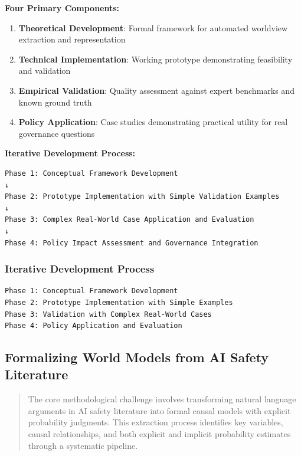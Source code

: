 \documentclass[
  11pt,
  letterpaper,
]{book}
\providecommand{\tightlist}{%
  \setlength{\itemsep}{0pt}\setlength{\parskip}{0pt}}
\begin{document}
\textbf{Four Primary Components:}

\begin{enumerate}
\def\labelenumi{\arabic{enumi}.}
\tightlist
\item
  \textbf{Theoretical Development}: Formal framework for automated
  worldview extraction and representation
\item
  \textbf{Technical Implementation}: Working prototype demonstrating
  feasibility and validation
\item
  \textbf{Empirical Validation}: Quality assessment against expert
  benchmarks and known ground truth
\item
  \textbf{Policy Application}: Case studies demonstrating practical
  utility for real governance questions
\end{enumerate}

\textbf{Iterative Development Process:}

\begin{verbatim}
Phase 1: Conceptual Framework Development
↓
Phase 2: Prototype Implementation with Simple Validation Examples  
↓
Phase 3: Complex Real-World Case Application and Evaluation
↓
Phase 4: Policy Impact Assessment and Governance Integration
\end{verbatim}

\subsubsection{Iterative Development
Process}\label{sec-iterative-process}

\begin{verbatim}
Phase 1: Conceptual Framework Development
Phase 2: Prototype Implementation with Simple Examples  
Phase 3: Validation with Complex Real-World Cases
Phase 4: Policy Application and Evaluation
\end{verbatim}

\subsection{Formalizing World Models from AI Safety
Literature}\label{sec-formalizing-world-models}

\begin{quote}
The core methodological challenge involves transforming natural language
arguments in AI safety literature into formal causal models with
explicit probability judgments. This extraction process identifies key
variables, causal relationships, and both explicit and implicit
probability estimates through a systematic pipeline.
\end{quote}
\end{document}
